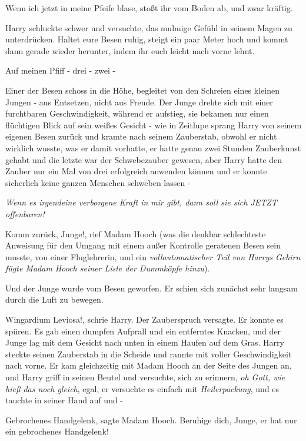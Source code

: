 \glqq{}Wenn ich jetzt in meine Pfeife blase, stoßt ihr vom Boden ab, und zwar
kräftig.\grqq{}

Harry schluckte schwer und versuchte, das mulmige Gefühl in seinem Magen zu
unterdrücken. \glqq{}Haltet eure Besen ruhig, steigt ein paar Meter hoch und
kommt dann gerade wieder herunter, indem ihr euch leicht nach vorne lehnt.

Auf meinen Pfiff - drei - zwei -\grqq{}

Einer der Besen schoss in die Höhe, begleitet von den Schreien eines kleinen
Jungen - aus Entsetzen, nicht aus Freude. Der Junge drehte sich mit einer
furchtbaren Geschwindigkeit, während er aufstieg, sie bekamen nur einen
flüchtigen Blick auf sein weißes Gesicht - wie in Zeitlupe sprang Harry von
seinem eigenen Besen zurück und kramte nach seinem Zauberstab, obwohl er nicht
wirklich wusste, was er damit vorhatte, er hatte genau zwei Stunden Zauberkunst
gehabt und die letzte war der Schwebezauber gewesen, aber Harry hatte den Zauber
nur ein Mal von drei erfolgreich anwenden können und er konnte sicherlich keine
ganzen Menschen schweben lassen -

\emph{Wenn es irgendeine verborgene Kraft in mir gibt, dann soll sie sich JETZT
offenbaren!}

\glqq{}Komm zurück, Junge!\grqq{}, rief Madam Hooch (was die denkbar schlechteste
Anweisung für den Umgang mit einem außer Kontrolle geratenen Besen sein musste,
von einer Fluglehrerin, und ein \emph{vollautomatischer Teil von Harrys Gehirn
fügte Madam Hooch seiner Liste der Dummköpfe hinzu}).

Und der Junge wurde vom Besen geworfen. Er schien sich zunächst sehr langsam
durch die Luft zu bewegen.

\glqq{}Wingardium Leviosa!\grqq{}, schrie Harry. Der Zauberspruch versagte. Er
konnte es spüren. Es gab einen dumpfen Aufprall und ein entferntes Knacken, und
der Junge lag mit dem Gesicht nach unten in einem Haufen auf dem Gras. Harry
steckte seinen Zauberstab in die Scheide und rannte mit voller Geschwindigkeit
nach vorne. Er kam gleichzeitig mit Madam Hooch an der Seite des Jungen an, und
Harry griff in seinen Beutel und versuchte, sich zu erinnern, \emph{oh Gott, wie
hieß das noch gleich}, egal, er versuchte es einfach mit \glqq{}
\emph{Heilerpackung}\grqq{}, und es tauchte in seiner Hand auf und -

\glqq{}Gebrochenes Handgelenk\grqq{}, sagte Madam Hooch. \glqq{}Beruhige dich,
Junge, er hat nur ein gebrochenes Handgelenk!\grqq{}


